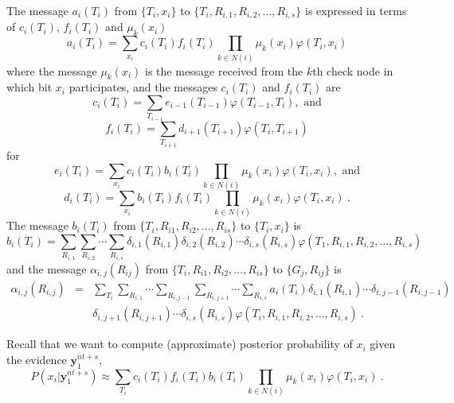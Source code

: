 {The message $a_i(T_i)$ from $\{T_{i},x_i\}$ to $\{T_i,
R_{i,1},R_{i,2},\dots, R_{i,s}\}$ is expressed in terms of
$c_i(T_i)$, $f_i(T_i)$ and $\mu_k(x_i)$
\begin{equation}
a_i(T_i)=\sum_{x_i}c_i(T_i)f_i(T_i) \prod_{k \in N(i)} \mu_k(x_i)
\varphi(T_i,x_i)
\end{equation}
where the message $\mu_k(x_i)$ is the message received from the
$k$th check node in which bit $x_i$ participates, and the messages
$c_i(T_i)$ and $f_i(T_i)$ are
\begin{equation}
c_i(T_i)=\sum_{T_{i-1}}e_{i-1}(T_{i-1})\varphi(T_{i-1},T_{i}),
\text{ and}
\end{equation}
\begin{equation}
f_i(T_i)=\sum_{T_{i+1}}d_{i+1}(T_{i+1})\varphi(T_{i},T_{i+1})
\end{equation}
for
\begin{equation}
e_i(T_i)=\sum_{x_i}c_i(T_i)b_i(T_i) \prod_{k \in N(i)}
\mu_k(x_i)\varphi(T_i,x_i), \text{ and}
\end{equation}
\begin{equation}
d_i(T_i)=\sum_{x_i}b_i(T_i)f_i(T_i) \prod_{k \in N(i)} \mu_k(x_i)
\varphi(T_i,x_i)~.
\end{equation}
The message $b_i(T_i)$ from $\{T_i, R_{i1},R_{i2},\dots,R_{is}\}$ to
$\{T_i,x_i\}$ is
\begin{equation}
b_i(T_i)=\sum_{R_{i,1}}\sum_{R_{i,2}}\cdots\sum_{R_{i,s}}
\delta_{i,1}(R_{i,1})\delta_{i,2}(R_{i,2})\cdots\delta_{i,s}(R_{i,s})
\varphi(T_1,R_{i,1},R_{i,2},\dots,R_{i,s})
\end{equation}
and the message $\alpha_{i,j}(R_{ij})$ from $\{T_i,
R_{i1},R_{i2},\dots,R_{is}\}$ to $\{G_j,R_{ij}\}$ is
\begin{equation}\begin{array}{lll}
\alpha_{i,j}(R_{i,j})&=&\sum_{T_i}\sum_{R_{i,1}}\cdots\sum_{R_{i,j-1}}\sum_{R_{i,j+1}}\cdots\sum_{R_{i,s}}
a_i(T_i)\delta_{i,1}(R_{i,1})\cdots\delta_{i,j-1}(R_{i,j-1})\\
{}&{}&\delta_{i,j+1}(R_{i,j+1})\cdots\delta_{i,s}(R_{i,s})
\varphi(T_i,R_{i,1},R_{i,2},\dots,R_{i,s})~.
\end{array}\end{equation}


Recall that we want to compute (approximate) posterior probability
of $x_i$ given the evidence $\mathbf{y}_1^{nt+s}$,
\begin{equation}
P(x_i|\mathbf{y}_1^{nt+s}) \approx \sum_{T_i}
c_i(T_i)f_i(T_i)b_i(T_i)\prod_{k \in N(i)} \mu_k(x_i)
\varphi(T_i,x_i)~.
\end{equation}

}

